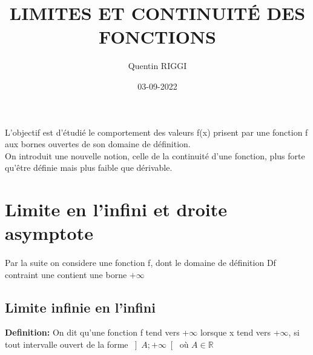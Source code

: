 \documentclass{article}
\title{\color{darkred}\Huge LIMITES ET CONTINUITÉ DES FONCTIONS}
\date{03-09-2022}
\author{Quentin RIGGI}
\renewcommand\large{\color{text}}
\begin{document}
	\maketitle
	\large L'objectif est d'étudié le comportement des valeurs f(x) prisent par une fonction f aux bornes ouvertes de son domaine de définition.\\
	\large On introduit une nouvelle notion, celle de la continuité d'une fonction, plus forte qu'être définie mais plus faible que dérivable.
	
	\section{Limite en l'infini et droite asymptote}
	\paragraph{} \large Par la suite on considere une fonction f, dont le domaine de définition Df contraint une contient une borne $+ \infty$ 

	\subsection{Limite infinie en l'infini}
	\textbf{\color{crimson}Definition:} On dit qu'une fonction f tend vers +$\infty$ lorsque x tend vers +$\infty$, si tout intervalle ouvert de la forme
	$\left]A; +\infty \right[$ où $A\in\mathbb{R}$
	
	
\end{document}
